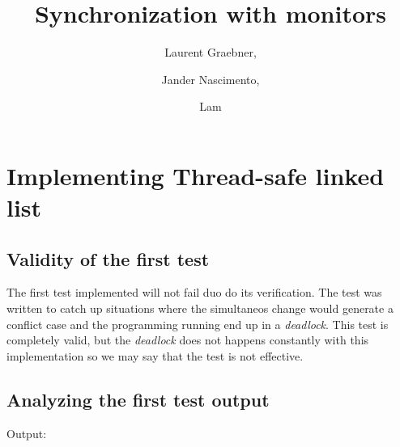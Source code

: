 \documentclass{article}
\begin{document}
\title{Synchronization with monitors}

\author{Laurent Graebner,
\and Jander Nascimento, 
\and Lam }

\maketitle

\tableofcontents

\section{Implementing Thread-safe linked list}          



\subsection{Validity of the first test}

The first test implemented will not fail duo do its verification. The test was written
to catch up situations where the simultaneos change would generate a conflict case and
the programming running end up in a \textit{deadlock}.
This test is completely valid, but the \textit{deadlock} does not happens constantly with 
this implementation so we may say that the test is not effective.

\subsection{Analyzing the first test output}

Output:
\end{document}

